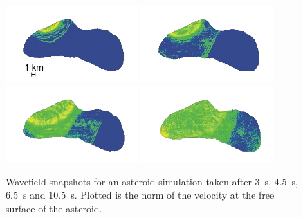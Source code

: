 \documentclass[referee,extra]{gji}
\begin{document}
\begin{figure}
\begin{center}
\includegraphics[width=0.45\textwidth]{./images/asteroid_1.jpg}
\includegraphics[width=0.45\textwidth]{./images/asteroid_2.jpg}
\includegraphics[width=0.45\textwidth]{./images/asteroid_3.jpg}
\includegraphics[width=0.45\textwidth]{./images/asteroid_4.jpg}
\end{center}
\caption{Wavefield snapshots for an asteroid simulation taken after 3~s,
4.5~s, 6.5~s and 10.5~s.
Plotted is the norm of the velocity at the free surface of the asteroid.
}
\label{figure:asteroid}
\end{figure}
\end{document}
